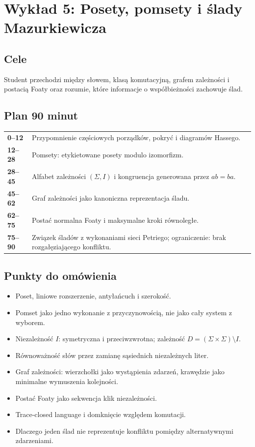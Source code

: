\documentclass[11pt,a4paper]{article}
\begin{document}
\section{Wykład 5: Posety, pomsety i ślady Mazurkiewicza}

\subsection{Cele}
Student przechodzi między słowem, klasą komutacyjną, grafem zależności i postacią Foaty oraz rozumie, które informacje o współbieżności zachowuje ślad.

\subsection{Plan 90 minut}
\begin{center}\small\begin{tabularx}{0.96\textwidth}{@{}>{\bfseries}p{18mm}X@{}}
0--12 & Przypomnienie częściowych porządków, pokryć i diagramów Hassego.\\
12--28 & Pomsety: etykietowane posety modulo izomorfizm.\\
28--45 & Alfabet zależności $(\Sigma,I)$ i kongruencja generowana przez $ab=ba$.\\
45--62 & Graf zależności jako kanoniczna reprezentacja śladu.\\
62--75 & Postać normalna Foaty i maksymalne kroki równoległe.\\
75--90 & Związek śladów z wykonaniami sieci Petriego; ograniczenie: brak rozgałęziającego konfliktu.\\
\end{tabularx}\end{center}

\subsection{Punkty do omówienia}
\begin{itemize}
\item Poset, liniowe rozszerzenie, antyłańcuch i szerokość.
\item Pomset jako jedno wykonanie z przyczynowością, nie jako cały system z wyborem.
\item Niezależność $I$: symetryczna i przeciwzwrotna; zależność $D=(\Sigma\times\Sigma)\setminus I$.
\item Równoważność słów przez zamianę sąsiednich niezależnych liter.
\item Graf zależności: wierzchołki jako wystąpienia zdarzeń, krawędzie jako minimalne wymuszenia kolejności.
\item Postać Foaty jako sekwencja klik niezależności.
\item Trace-closed language i domknięcie względem komutacji.
\item Dlaczego jeden ślad nie reprezentuje konfliktu pomiędzy alternatywnymi zdarzeniami.
\end{itemize}
\end{document}
